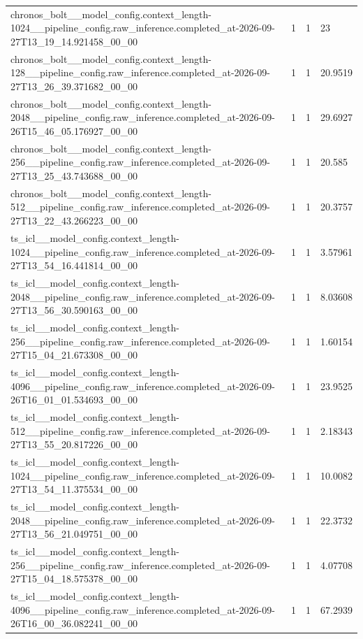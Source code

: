 \begin{tabular}{llll}
chronos\_bolt\_\_model\_config.context\_length-1024\_\_pipeline\_config.raw\_inference.completed\_at-2026-09-27T13\_19\_14.921458\_00\_00 & 1 & 1 & 23 \\
chronos\_bolt\_\_model\_config.context\_length-128\_\_pipeline\_config.raw\_inference.completed\_at-2026-09-27T13\_26\_39.371682\_00\_00 & 1 & 1 & 20.9519 \\
chronos\_bolt\_\_model\_config.context\_length-2048\_\_pipeline\_config.raw\_inference.completed\_at-2026-09-26T15\_46\_05.176927\_00\_00 & 1 & 1 & 29.6927 \\
chronos\_bolt\_\_model\_config.context\_length-256\_\_pipeline\_config.raw\_inference.completed\_at-2026-09-27T13\_25\_43.743688\_00\_00 & 1 & 1 & 20.585 \\
chronos\_bolt\_\_model\_config.context\_length-512\_\_pipeline\_config.raw\_inference.completed\_at-2026-09-27T13\_22\_43.266223\_00\_00 & 1 & 1 & 20.3757 \\
ts\_icl\_\_model\_config.context\_length-1024\_\_pipeline\_config.raw\_inference.completed\_at-2026-09-27T13\_54\_16.441814\_00\_00 & 1 & 1 & 3.57961 \\
ts\_icl\_\_model\_config.context\_length-2048\_\_pipeline\_config.raw\_inference.completed\_at-2026-09-27T13\_56\_30.590163\_00\_00 & 1 & 1 & 8.03608 \\
ts\_icl\_\_model\_config.context\_length-256\_\_pipeline\_config.raw\_inference.completed\_at-2026-09-27T15\_04\_21.673308\_00\_00 & 1 & 1 & 1.60154 \\
ts\_icl\_\_model\_config.context\_length-4096\_\_pipeline\_config.raw\_inference.completed\_at-2026-09-26T16\_01\_01.534693\_00\_00 & 1 & 1 & 23.9525 \\
ts\_icl\_\_model\_config.context\_length-512\_\_pipeline\_config.raw\_inference.completed\_at-2026-09-27T13\_55\_20.817226\_00\_00 & 1 & 1 & 2.18343 \\
ts\_icl\_\_model\_config.context\_length-1024\_\_pipeline\_config.raw\_inference.completed\_at-2026-09-27T13\_54\_11.375534\_00\_00 & 1 & 1 & 10.0082 \\
ts\_icl\_\_model\_config.context\_length-2048\_\_pipeline\_config.raw\_inference.completed\_at-2026-09-27T13\_56\_21.049751\_00\_00 & 1 & 1 & 22.3732 \\
ts\_icl\_\_model\_config.context\_length-256\_\_pipeline\_config.raw\_inference.completed\_at-2026-09-27T15\_04\_18.575378\_00\_00 & 1 & 1 & 4.07708 \\
ts\_icl\_\_model\_config.context\_length-4096\_\_pipeline\_config.raw\_inference.completed\_at-2026-09-26T16\_00\_36.082241\_00\_00 & 1 & 1 & 67.2939 \\

\end{tabular}
